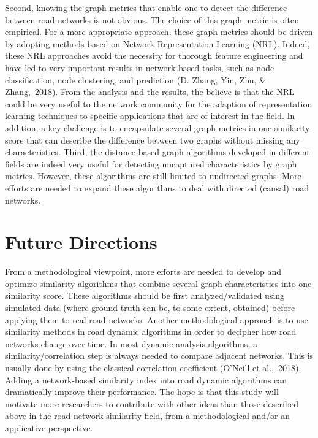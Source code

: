Second, knowing the graph metrics that enable one to detect the difference between road networks is not obvious. The choice of this graph metric is often empirical. For a more appropriate approach, these graph metrics should be driven by adopting methods based on Network Representation Learning (NRL). Indeed, these NRL approaches avoid the necessity for thorough feature engineering and have led to very important results in network-based tasks, such as node classification, node clustering, and prediction (D. Zhang, Yin, Zhu, & Zhang, 2018). From the analysis and the results, the believe is that the NRL could be very useful to the network community for the adaption of representation learning techniques to specific applications that are of interest in the field. In addition, a key challenge is to encapsulate several graph metrics in one similarity score that can describe the difference between two graphs without missing any characteristics.
Third, the distance-based graph algorithms developed in different fields are indeed very useful for detecting uncaptured characteristics by graph metrics. However, these algorithms are still limited to undirected graphs. More efforts are needed to expand these algorithms to deal with directed (causal) road networks.


\section{Future Directions}
From a methodological viewpoint, more efforts are needed to develop and optimize similarity algorithms that combine several graph characteristics into one similarity score. These algorithms should be first analyzed/validated using simulated data (where ground truth can be, to some extent, obtained) before applying them to real road networks. Another methodological approach is to use similarity methods in road dynamic algorithms in order to decipher how road networks change over time. In most dynamic analysis algorithms, a similarity/correlation step is always needed to compare adjacent networks. This is usually done by using the classical correlation coefficient (O’Neill et al., 2018). Adding a network-based similarity index into road dynamic algorithms can dramatically improve their performance.
The hope is that this study will motivate more researchers to contribute with other ideas than those described above in the road network similarity field, from a methodological and/or an applicative perspective.